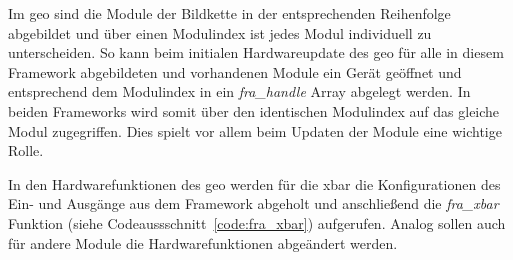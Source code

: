 Im \ac{geo} sind die Module der Bildkette in der entsprechenden Reihenfolge abgebildet und über einen Modulindex ist jedes Modul individuell zu unterscheiden. So kann beim initialen Hardwareupdate des \ac{geo} für alle in diesem Framework abgebildeten und vorhandenen Module ein Gerät geöffnet und entsprechend dem Modulindex in ein \textit{fra\_handle} Array abgelegt werden. In beiden Frameworks wird somit über den identischen Modulindex auf das gleiche Modul zugegriffen. Dies spielt vor allem beim Updaten der Module eine wichtige Rolle.


In den Hardwarefunktionen des \ac{geo} werden für die \ac{xbar} die Konfigurationen des Ein- und Ausgänge aus dem Framework abgeholt und anschließend die \textit{fra\_xbar} Funktion (siehe Codeaussschnitt~\ref{code:fra_xbar}) aufgerufen. Analog sollen auch für andere Module die Hardwarefunktionen abgeändert werden.








